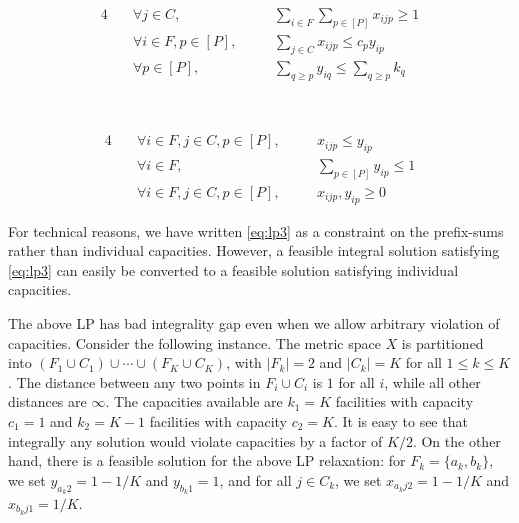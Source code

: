 \begin{minipage}{0.45\textwidth}
\begin{alignat}{4}
& \quad \forall j\in C,   &&\quad  \textstyle \sum_{i\in F} \sum_{p\in [P]}  x_{ijp} \geq 1 \label{eq:lp1} \\
& \quad \forall i\in F,p\in [P] ,  &&\quad  \textstyle \sum_{j\in C}  x_{ijp} \leq c_py_{ip} \label{eq:lp2} \\
& \quad \forall p\in [P], && \quad \textstyle \sum_{q \geq p} y_{iq}   \leq \sum_{q\geq p} k_q \label{eq:lp3}  
\end{alignat}
\end{minipage}
~\vline~
\begin{minipage}{0.45\textwidth}
	\begin{alignat}{4}
	& \quad \forall i\in F, j\in C,p\in [P],  && \quad x_{ijp} \leq y_{ip}\label{eq:lp4}   \\
	& \quad \forall i\in F, && \quad \textstyle\sum_{p\in [P]} y_{ip} \leq 1 \label{eq:lp5}  \\
	& \quad \forall i\in F,j\in C,p\in [P], && \quad x_{ijp},y_{ip} \geq 0\label{eq:lp6}
	\end{alignat}
\end{minipage}
\smallskip

For technical reasons, we have written \eqref{eq:lp3} as a constraint on the prefix-sums rather than individual capacities. However, a feasible integral solution satisfying \eqref{eq:lp3} can easily be converted to a feasible solution satisfying individual capacities.

The above LP has bad integrality gap even when we allow arbitrary violation of capacities. 
Consider the following instance. The metric space $X$ is partitioned into $(F_1\cup C_1) \cup \cdots \cup (F_K\cup C_K)$, with $|F_k| = 2$ and $|C_k| = K$ for all $1\le k\le K$.
The distance between any two points in $F_i\cup C_i$ is $1$ for all $i$, while all other distances are $\infty$. The capacities available are $k_1 = K$ facilities with capacity $c_1 = 1$ and 
$k_2= K-1$ facilities with capacity $c_2 = K$. It is easy to see that integrally any solution would violate capacities by a factor of $K/2$.
On the other hand, there is a feasible solution for the above LP relaxation: for $F_k = \{a_k,b_k\}$, we set $y_{a_k2} = 1-1/K$ and $y_{b_k1} = 1$, and for all $j\in C_k$, we set $x_{a_kj2} = 1-1/K$ and $x_{b_kj1} = 1/K$.
%
%


